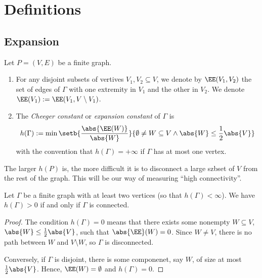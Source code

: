 \section{Definitions}

\subsection{Expansion}


\begin{definition}
    Let $P = (V ,E)$ be a finite graph.
    \begin{enumerate}[(1)]
        \item For any disjoint subsets of vertives $V_1,V_2 \subseteq V$, 
        we denote by $\EE(V_1, V_2)$ the set of edges of $\Gamma$ with 
        one extremity in $V_1$ and the other in $V_2$. 
        We denote $\EE(V_1) := \EE(V_1, V \setminus V_1)$.
        \item The \emph{Cheeger constant} or \emph{expansion constant} 
        of $\Gamma$ is
        \[
            h(\Gamma) := \min\setb{\frac{\abs{\EE(W)}}{\abs{W}}}
            {\emptyset \neq W \subseteq V \land \abs{W} \le \frac{1}{2}\abs{V}}
        \]
        with the convention that $h(\Gamma) = +\infty$ if $\Gamma$ has 
        at most one vertex.
    \end{enumerate}
\end{definition}

The larger $h(P)$ is, the more difficult it is to disconnect a large szbset of $V$ from 
the rest of the graph. This will be our way of measuring ``high connectivity''.

\begin{lemma}
    Let $\Gamma$ be a finite graph with at least two vertices (so that $h(\Gamma) < \infty$).
    We have $h(\Gamma) > 0$ if and only if $\Gamma$ is connected.
\end{lemma}

\begin{proof}
    The condition $h(\Gamma) = 0$ means that there exists some nonempty $W \subseteq V$, 
    $\abs{W} \le \frac{1}{2}\abs{V}$, such that $\abs{\EE}(W) = 0$. Since $W \neq V$,
    there is no path between $W$ and $V \setminus W$, so $\Gamma$ is disconnected.
    
    Conversely, if $\Gamma$ is disjoint, there is some componenet, say $W$, of size 
    at most $\frac{1}{2} \abs{V}$. Hence, $\EE(W) = \emptyset$ and $h(\Gamma) = 0$.
\end{proof}